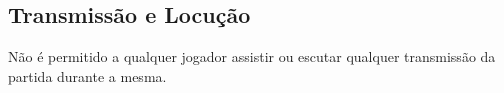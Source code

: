 \subsection{Transmissão e Locução}

Não é permitido a qualquer jogador assistir ou escutar qualquer transmissão da partida durante a mesma.
